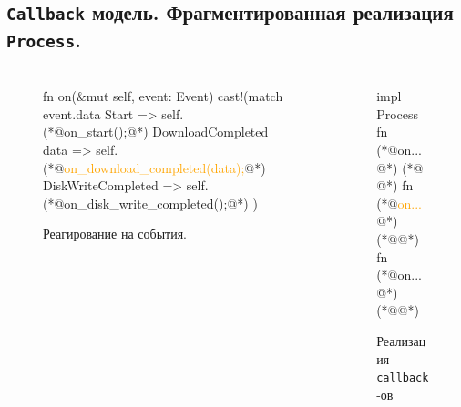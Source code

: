 \documentclass[t]{beamer}  %
\begin{document}
	\subsection{\texttt{Callback} модель. Фрагментированная реализация \texttt{Process}.}
	\begin{frame}[fragile]
		\frametitle{\insertsection} 
		\framesubtitle{\insertsubsection}
		\begin{columns}[c] 
			\begin{column}{0.73\textwidth} %
		\begin{figure}
			\scriptsize
			\centering
			\begin{rustcode}[escapeinside={(*@}{@*)}]
fn on(&mut self, event: Event) {
  cast!(match event.data {
    Start {} => {
      self.(*@\footnotesize\textcolor{OldHSEblue}{on\_start();}@*)
    }
    DownloadCompleted {data} => {
      self.(*@\footnotesize\textcolor{orange}{on\_download\_completed(data);}@*)
    }
    DiskWriteCompleted => {
      self.(*@\footnotesize\textcolor{HSEgreen}{on\_disk\_write\_completed();}@*)
    }
  })
}
			\end{rustcode}
			\caption*{Реагирование на события.}
		\end{figure}

	\end{column}
	
	\begin{column}[c]{0.24\textwidth}
		\begin{figure}
			\scriptsize
			\centering
			\begin{rustcode}[escapeinside={(*@}{@*)}]
impl Process {
  fn (*@\footnotesize\textcolor{OldHSEblue}{on...}@*) {
    (*@\tikz{\node[draw, fill=OldHSEblue, rounded corners, minimum width=1.5em, minimum height=1.5em, opacity=0.75] {};}
	@*)
  }
  fn (*@\footnotesize\textcolor{orange}{on...}@*) {
    (*@\tikz{\node[draw, fill=orange, rounded corners, minimum width=1.5em, minimum height=1.5em, opacity=0.75] {};}@*)
  }
  fn (*@\footnotesize\textcolor{HSEgreen}{on...}@*) {
    (*@\tikz{\node[draw, fill=HSEgreen, rounded corners, minimum width=1.5em, minimum height=1.5em, opacity=0.75] {};}@*)
  }
}
			\end{rustcode}
			\caption*{Реализация \texttt{callback}-ов}
		\end{figure}
	\end{column}
	\end{columns}

	\end{frame}
\end{document}
